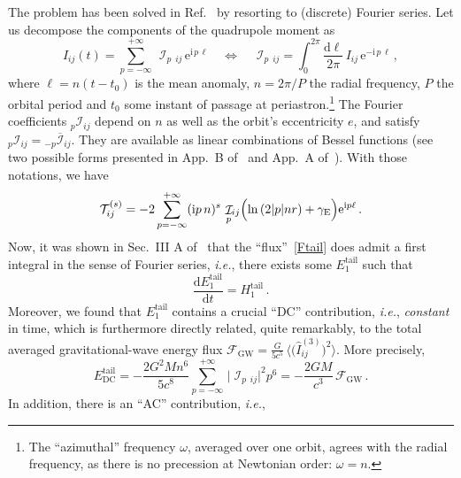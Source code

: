 \documentclass[prd,preprint,superscriptaddress,tightenlines,nofootinbib,
  eqsecnum,showpacs]{revtex4}
\newcommand{\ud}{\mathrm{d}}
\newcommand{\ui}{\mathrm{i}}
\newcommand{\ue}{\mathrm{e}}
\begin{document}
The problem has been solved in Ref.~\cite{BBBFMb} by resorting to (discrete)
Fourier series. Let us decompose the components of the quadrupole moment as
%
\begin{equation}\label{Fourier}
I_{ij}(t) =
\sum_{p=-\infty}^{+\infty}\,\mathop{{\mathcal{I}}}_{p}{}_{\!\!ij}\,\ue^{\ui
  \,p\,\ell} \quad\Longleftrightarrow\quad \mathop{{\mathcal{I}}}_{p}{}_{\!\!ij} =
\int_0^{2\pi}\frac{\ud\ell}{2\pi}\,I_{ij}\,\ue^{-\ui\, p\,\ell}\,,
\end{equation}
%
where $\ell=n(t-t_0)$ is the mean anomaly, $n=2\pi/P$ the radial frequency,
$P$ the orbital period and $t_0$ some instant of passage at
periastron.\footnote{The ``azimuthal'' frequency $\omega$, averaged over one
  orbit, agrees with the radial frequency, as there is no precession at
  Newtonian order: $\omega=n$.} The Fourier coefficients
${}_p\mathcal{I}_{ij}$ depend on $n$ as well as the orbit's eccentricity $e$, and
satisfy ${}_{p}{\mathcal{I}}_{ij}={}_{-p}{\overline{\mathcal{I}}}_{ij}$. They
are available as linear combinations of Bessel functions (see two
possible forms presented in App.~B of~\cite{BBBFMb} and App.~A
of~\cite{ABIQ08tail}). With those notations, we have
%
\begin{equation}\label{tailfactorFourier}
\mathcal{T}_{ij}^{(s)} = -2 \sum_{p=-\infty}^{+\infty} (\ui
p\,n)^s\,\mathop{{\mathcal{I}}}_{p}{}_{\!\!ij} \Bigl(\ln\left(2\vert
p\vert n r\right) + \gamma_\text{E} \Bigr)\ue^{\ui p \ell}\,.
\end{equation}
% 
Now, it was shown in Sec.~III A of~\cite{BBBFMb} that the
``flux''~\eqref{Ftail} does admit a first integral in the sense of Fourier
series, \textit{i.e.}, there exists some $E_1^\text{tail}$ such that
%
\begin{equation}
\frac{\ud E_1^\text{tail}}{\ud t} = H_1^\text{tail}\,.
\end{equation}
%
Moreover, we found that $E_1^\text{tail}$ contains a crucial ``DC'' contribution,
\textit{i.e.}, \textit{constant} in time, which is furthermore directly
related, quite remarkably, to the total averaged gravitational-wave energy flux
$\mathcal{F}_\text{GW} =
\frac{G}{5c^5}\,\langle\bigl(\hat{I}_{ij}^{(3)}\bigr)^2\rangle$.
More precisely,
%
\begin{equation}\label{EDC}
E_\text{DC}^\text{tail} = - \frac{2G^2M n^6}{5c^8}
\sum_{p=-\infty}^{+\infty}\,
\vert\mathop{{\mathcal{I}}}_{p}{}_{\!\!ij}\vert^2 p^6 = -
\frac{2G M}{c^3}\,\mathcal{F}_\text{GW}\,.
\end{equation}
%
In addition, there is an ``AC'' contribution, \textit{i.e.},
\end{document}
